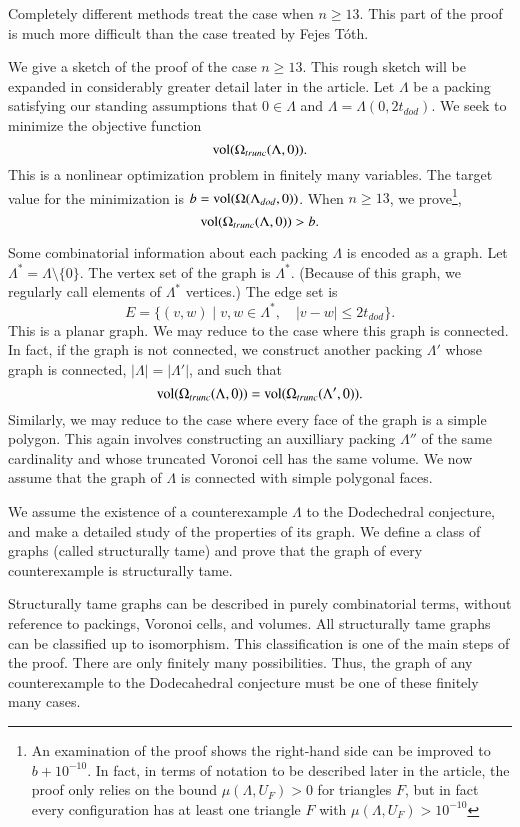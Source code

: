 Completely different methods treat the case when $n\ge 13$.  
This part of the proof is
much more difficult than the case treated by Fejes T\'oth.

We give a sketch of the proof of the case $n\ge 13$.   This
rough sketch will be expanded in considerably greater detail later
in the article.
Let $\Lambda$ be a packing satisfying our standing assumptions
that $0\in\Lambda$ and $\Lambda = \Lambda(0,2t_{dod})$.
We seek to minimize the objective function 
$$
{\operatorname{vol}}(\Omega_{trunc}(\Lambda,0)).
$$
This is a nonlinear optimization problem in finitely many variables.
The target value for the minimization is $b={\operatorname{vol}}(\Omega(\Lambda_{dod},0))$.  When $n\ge 13$, we prove\footnote{An examination of the proof shows the right-hand side can be improved to $b+10^{-10}$.  In fact, in terms of notation to be described later in the article, the proof only
relies on the bound $\mu(\Lambda,U_F) >0$ for triangles $F$, but in fact every configuration has at least one triangle $F$ with $\mu(\Lambda,U_F) > 10^{-10}$},
   $$
   {\operatorname{vol}}(\Omega_{trunc}(\Lambda,0))  > b.
   $$



Some combinatorial information about each packing $\Lambda$ is encoded
as a  graph.  Let $\Lambda^* = \Lambda\setminus\{0\}$. 
The vertex set of the graph is $\Lambda^*$.
(Because of this graph, we regularly call elements of $\Lambda^*$ vertices.)
The edge set is 
  $$
  E = \{(v,w) \mid v,w\in\Lambda^*,\quad   |v-w| \le 2t_{dod}\}.
  $$
This is a planar graph.  
We may reduce to the case where this graph is connected.  In fact,
if the graph is not connected, we construct another packing
$\Lambda'$ whose graph is connected, $|\Lambda|=|\Lambda'|$, 
and such that
$$
   {\operatorname{vol}}(\Omega_{trunc}(\Lambda,0)) = {\operatorname{vol}}(\Omega_{trunc}(\Lambda',0)). 
$$
Similarly, we may reduce to the case where every face of the graph
is a simple polygon.  This again involves constructing an auxilliary 
packing $\Lambda''$ of the same cardinality and whose  truncated Voronoi cell has the same volume.  We now assume that the graph of $\Lambda$ is 
connected with simple polygonal faces.

We assume the existence of a counterexample $\Lambda$ to the Dodechedral
conjecture, and make a detailed study of the properties of its
graph.  We define a class of graphs (called structurally tame) and
prove that the graph of every counterexample is structurally tame.

Structurally tame graphs can be described in purely combinatorial
terms, without reference to packings, Voronoi cells, and volumes.
All structurally tame graphs can be classified up to isomorphism.
This classification is one of the main steps of the proof.
There are only finitely many possibilities.  Thus, the graph
of any counterexample
to the Dodecahedral conjecture must be one of these finitely
many cases.

